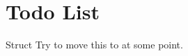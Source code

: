 \chapter{Todo List}
\hypertarget{todo}{}\label{todo}

\begin{DoxyRefList}
\item[Struct \doxylink{structfmt_1_1formatter_3_01_o_g_r_i_d_1_1_player_name_and_ptr_01_4}{fmt\+::formatter\texorpdfstring{$<$}{<} OGRID\+::Player\+Name\+And\+Ptr \texorpdfstring{$>$}{>}} ]\label{todo__todo000001}%
%
Try to move this to  at some point. 
\end{DoxyRefList}